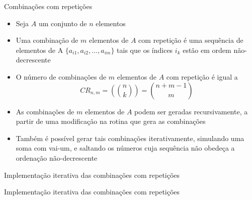 \begin{frame}[fragile]{Combinações com repetições}

    \begin{itemize}
        \item Seja $A$ um conjunto de $n$ elementos

        \item Uma combinação de $m$ elementos de $A$ com repetição é uma sequência de elementos 
            de A $\lbrace a_{i1}, a_{i2}, \ldots, a_{im}\rbrace$ tais que os índices $i_k$ estão
            em ordem não-decrescente

        \item O número de combinações de $m$ elementos de $A$ com repetição é igual a 
        \[
            CR_{n,m} =\left(\!\!\!\binom{n}{k}\!\!\!\right) = \binom{n + m - 1}{m}
        \]

        \item As combinações de $m$ elementos de $A$ podem ser geradas recursivamente, a
            partir de uma modificação na rotina que gera as combinações

        \item Também é possível gerar tais combinações iterativamente, simulando uma soma
            com vai-um, e saltando os números cuja sequência não obedeça a ordenação
            não-decrescente
 
    \end{itemize}

\end{frame}

\begin{frame}[fragile]{Implementação iterativa das combinações com repetições}
\end{frame}

\begin{frame}[fragile]{Implementação iterativa das combinações com repetições}
\end{frame}





